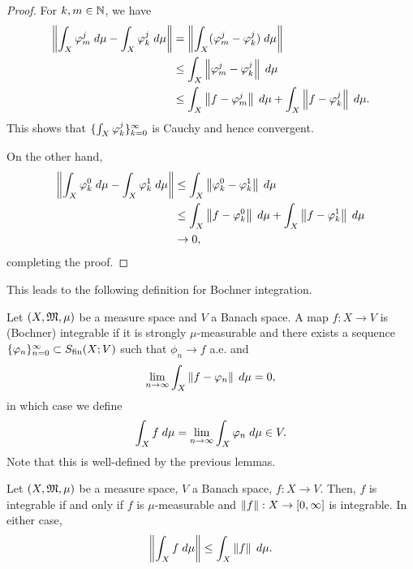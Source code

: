\documentclass[a4paper]{article}
\begin{document}
\begin{proof}
For $k, m \in \mathbb{N}$, we have 
\[
\begin{aligned}
  \left\lVert \int_X \varphi_m^j \; d\mu - \int_X \varphi_k^j \; d \mu\right\rVert 
  &= \left\lVert \int_X (\varphi_m^j - \varphi_k^j) \; d \mu\right\rVert \\
  &\leq \int_X \left\lVert \varphi_m^j - \varphi_k^j\right\rVert \; d \mu \\
  &\leq \int_X \left\lVert f - \varphi_m^j\right\rVert \; d \mu
  + \int_X \left\lVert f - \varphi_k^j\right\rVert \; d \mu.
\end{aligned}
\]
This shows that $\{ \int_X \varphi_k^j \}_{k=0}^\infty$ is Cauchy
and hence convergent. 

On the other hand, 
\[
\begin{aligned}
\left\lVert \int_X \varphi_k^0 \; d \mu - \int_X \varphi_k^1 \; d \mu\right\rVert
&\leq \int_X \left\lVert \varphi_k^0 - \varphi_k^1\right\rVert \; d \mu \\
&\leq \int_X \left\lVert f - \varphi_k^0\right\rVert \; d \mu
+ \int_X \left\lVert f - \varphi_k^1\right\rVert \; d \mu \\
&\to 0,
\end{aligned}
\]
completing the proof.
\end{proof}

This leads to the following definition for Bochner integration.

\begin{defi}
Let $(X, \mathfrak{M}, \mu)$ be a measure space and $V$ a Banach space. 
A map $f : X \to V$ is (Bochner) integrable if 
it is strongly $\mu$-measurable and there exists a sequence
$\{ \varphi_n \}_{n=0}^\infty \subset S_{\text{fin}}(X; V)$ such that $\phi_n \to f$
a.e. and 
\[
\lim_{n \to \infty} \int_X \left\lVert f - \varphi_n\right\rVert \; d \mu = 0,
\] 
in which case we define 
\[
\int_X f \; d \mu = \lim_{n \to \infty} \int_X \varphi_n \; d \mu \in V.
\]
Note that this is well-defined by the previous lemmas.
\end{defi}

\begin{thm}
Let $(X, \mathfrak{M}, \mu)$ be a measure space, $V$ a Banach space, 
$f : X \to V$. Then, 
$f$ is integrable if and only if $f$ is $\mu$-measurable 
and $\left\lVert f\right\rVert : X \to [0, \infty]$ is integrable.
In either case, 
\[
\left\lVert \int_X f \; d \mu\right\rVert \leq \int_X \left\lVert f\right\rVert \; d \mu.
\]
\end{thm}
\end{document}
